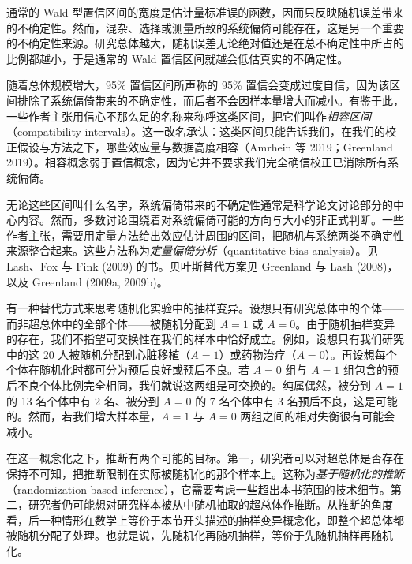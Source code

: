 \begin{finepoint}[系统偏倚带来的不确定性]
通常的 Wald 型置信区间的宽度是估计量标准误的函数，因而只反映随机误差带来的不确定性。然而，混杂、选择或测量所致的系统偏倚可能存在，这是另一个重要的不确定性来源。研究总体越大，随机误差无论绝对值还是在总不确定性中所占的比例都越小，于是通常的 Wald 置信区间就越会低估真实的不确定性。

随着总体规模增大，95\% 置信区间所声称的 95\% 置信会变成过度自信，因为该区间排除了系统偏倚带来的不确定性，而后者不会因样本量增大而减小。有鉴于此，一些作者主张用信心不那么足的名称来称呼这类区间，把它们叫作\emph{相容区间}（compatibility intervals）。这一改名承认：这类区间只能告诉我们，在我们的校正假设与方法之下，哪些效应量与数据高度相容（Amrhein 等 2019；Greenland 2019）。相容概念弱于置信概念，因为它并不要求我们完全确信校正已消除所有系统偏倚。

无论这些区间叫什么名字，系统偏倚带来的不确定性通常是科学论文讨论部分的中心内容。然而，多数讨论围绕着对系统偏倚可能的方向与大小的非正式判断。一些作者主张，需要用定量方法给出效应估计周围的区间，把随机与系统两类不确定性来源整合起来。这些方法称为\emph{定量偏倚分析}（quantitative bias analysis）。见 Lash、Fox 与 Fink (2009) 的书。贝叶斯替代方案见 Greenland 与 Lash (2008)，以及 Greenland (2009a, 2009b)。
\end{finepoint}

有一种替代方式来思考随机化实验中的抽样变异。设想只有研究总体中的个体——而非超总体中的全部个体——被随机分配到 $A=1$ 或 $A=0$。由于随机抽样变异的存在，我们不指望可交换性在我们的样本中恰好成立。例如，设想只有我们研究中的这 20 人被随机分配到心脏移植（$A=1$）或药物治疗（$A=0$）。再设想每个个体在随机化时都可分为预后良好或预后不良。若 $A=0$ 组与 $A=1$ 组包含的预后不良个体比例完全相同，我们就说这两组是可交换的。纯属偶然，被分到 $A=1$ 的 13 名个体中有 2 名、被分到 $A=0$ 的 7 名个体中有 3 名预后不良，这是可能的。然而，若我们增大样本量，$A=1$ 与 $A=0$ 两组之间的相对失衡很有可能会减小。

在这一概念化之下，推断有两个可能的目标。第一，研究者可以对超总体是否存在保持不可知，把推断限制在实际被随机化的那个样本上。这称为\emph{基于随机化的推断}（randomization-based inference），它需要考虑一些超出本书范围的技术细节。第二，研究者仍可能想对研究样本被从中随机抽取的超总体作推断。从推断的角度看，后一种情形在数学上等价于本节开头描述的抽样变异概念化，即整个超总体都被随机分配了处理。也就是说，先随机化再随机抽样，等价于先随机抽样再随机化。


